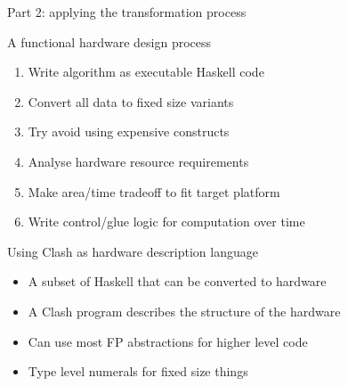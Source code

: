 \documentclass[pdf]{beamer}
\begin{document}
\begin{frame}{Part 2: applying the transformation process}

\begin{block}{A functional hardware design process}
\begin{enumerate}
\item Write algorithm as executable Haskell code
\item Convert all data to fixed size variants
\item Try avoid using expensive constructs %
\item Analyse hardware resource requirements
\item Make area/time tradeoff to fit target platform
\item Write control/glue logic for computation over time
\end{enumerate}
\end{block}

\begin{block}{Using Clash as hardware description language}
\begin{itemize}
\item A subset of Haskell that can be converted to hardware
\item A Clash program describes the structure of the hardware
\item Can use most FP abstractions for higher level code
\item Type level numerals for fixed size things
\end{itemize}
\end{block}

\end{frame}

\end{document}
